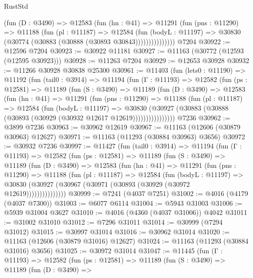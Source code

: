 \begin{lexlean}{RustStd}
\begin{coremodule}
                (fun (D : @3490) =>
                @12583
                  (fun (hn : @41) =>
                  @11291
                    (fun (pns : @11290) =>
                    @11188
                      (fun (pl : @11187) =>
                      @12584
                        (fun (bodyL : @11197) =>
                        @30830 (@30774 (@30883 (@30888 (@30893 @30843)))))))))))))))
    @7204
@30922 := @12596 @7204
@30923 := @30922 @11181
@30927 := @11163 (@30772 (@12593 (@12595 @30923)))
@30928 := @11263 @7204
@30929 := @12653 @30928
@30932 := @11266 @30928 @30838 @25300
@30961 := @11403
    (fun (lets0 : @11190) =>
    @11192
      (fun (tail0 : @3914) =>
      @11194
        (fun (Γ : @11193) =>
        @12582
          (fun (ps : @12581) =>
          @11189
            (fun (S : @3490) =>
            @11189
              (fun (D : @3490) =>
              @12583
                (fun (hn : @41) =>
                @11291
                  (fun (pns : @11290) =>
                  @11188
                    (fun (pl : @11187) =>
                    @12584
                      (fun (bodyL : @11197) =>
                      @30830
                        (@30927
                          (@30883 (@30888 (@30893 (@30929 (@30932 @12617 @12619))))))))))))))))
    @7236
@30962 := @3899 @7236
@30963 := @30962 @12619
@30967 := @11163 (@12606 (@30879 @30963) @12627)
@30971 := @11163 (@11293 (@30884 @30963) @3656)
@30972 := @30932 @7236
@30997 := @11427
    (fun (tail0 : @3914) =>
    @11194
      (fun (Γ : @11193) =>
      @12582
        (fun (ps : @12581) =>
        @11189
          (fun (S : @3490) =>
          @11189
            (fun (D : @3490) =>
            @12583
              (fun (hn : @41) =>
              @11291
                (fun (pns : @11290) =>
                @11188
                  (fun (pl : @11187) =>
                  @12584
                    (fun (bodyL : @11197) =>
                    @30830 (@30927 (@30967 (@30971 (@30893 (@30929 (@30972 @12619)))))))))))))))
@30999 := @7241 (@4037 @7251)
@31002 := @4016 (@4179 (@4037 @7300))
@31003 := @6077 @6114
@31004 := @5943 @31003
@31006 := @5939 @31004 @3627
@31010 := @4016 (@4360 (@4037 @31006)) @4042
@31011 := @31002 @31010
@31012 := @7296 @31011
@31014 := @30999 (@7294 @31012)
@31015 := @30997 @31014
@31016 := @30962 @31014
@31020 := @11163 (@12606 (@30879 @31016) @12627)
@31024 := @11163 (@11293 (@30884 @31016) @3656)
@31025 := @30972 @31014
@31047 := @11445
    (fun (Γ : @11193) =>
    @12582
      (fun (ps : @12581) =>
      @11189
        (fun (S : @3490) =>
        @11189
          (fun (D : @3490) =>

\end{coremodule}
\end{lexlean}
